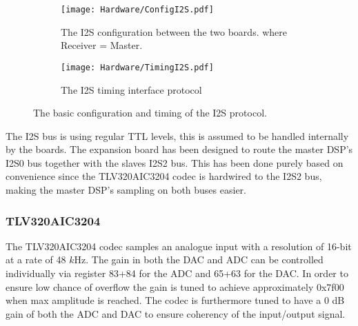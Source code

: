 \begin{figure}[H]
	\centering
	\begin{subfigure}[b]{.45\textwidth}
		\centering
		\texttt{[image: Hardware/ConfigI2S.pdf]}
		\caption{The I2S configuration between the two boards. where Receiver = Master.}
		\label{fig:I2Sconfig}
	\end{subfigure}
	\hfill
	\begin{subfigure}[b]{.45\textwidth}
		\centering
		\texttt{[image: Hardware/TimingI2S.pdf]}
		\caption{The I2S timing interface protocol}
		\label{fig:I2STiming}
	\end{subfigure}	
	\caption{The basic configuration and timing of the I2S protocol.}
\end{figure}

The I2S bus is using regular TTL levels, this is assumed to be handled internally by the boards. The expansion board has been designed to route the master DSP's I2S0 bus together with the slaves I2S2 bus. This has been done purely based on convenience since the TLV320AIC3204 codec is hardwired to the I2S2 bus, making the master DSP's sampling on both buses easier.

\subsubsection*{TLV320AIC3204}

The TLV320AIC3204 codec samples an analogue input with a resolution of 16-bit at a rate of 48 $k$Hz. The gain in both the DAC and ADC can be controlled individually via register 83+84 for the ADC and 65+63 for the DAC. In order to ensure low chance of overflow the gain is tuned to achieve approximately 0x7f00 when max amplitude is reached. The codec is furthermore tuned to have a 0 dB gain of both the ADC and DAC to ensure coherency of the input/output signal.

%


